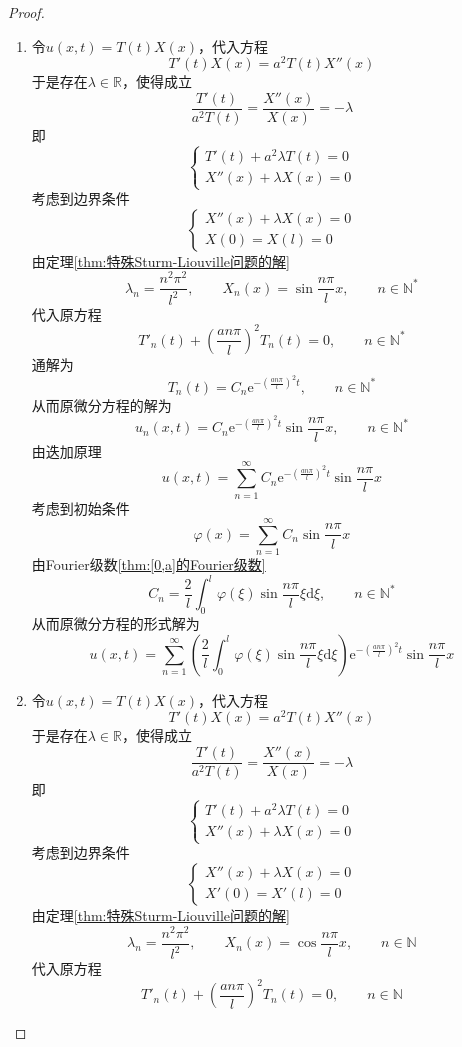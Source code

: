\documentclass[lang = cn, scheme = chinese, thmcnt = section]{elegantbook}
\newcommand{\N}{\mathbb{N}}            %
\newcommand{\R}{\mathbb{R}}            %
\newcommand{\dd}{\mathrm{d}}           %
\newcommand{\ee}[1]{\mathrm{e}^{#1}}   %
\begin{document}
\begin{proof}
	\begin{enumerate}
		\item 令$u(x,t)=T(t)X(x)$，代入方程
		$$
		T'(t)X(x)=a^2T(t)X''(x)
		$$
		于是存在$\lambda\in\R$，使得成立
		$$
		\frac{T'(t)}{a^2T(t)}
		=\frac{X''(x)}{X(x)}
		=-\lambda
		$$
		即%
		$$
		\begin{cases}
			T'(t)+a^2\lambda T(t)=0\\
			X''(x)+\lambda X(x)=0
		\end{cases}
		$$
		考虑到边界条件
		$$
		\begin{cases}
			X''(x)+\lambda X(x)=0\\
			X(0)=X(l)=0
		\end{cases}
		$$
		由定理\ref{thm:特殊Sturm-Liouville问题的解}
		$$
		\lambda_n=\frac{n^2\pi^2}{l^2},\qquad 
		X_n(x)=\sin\frac{n\pi}{l}x,\qquad n\in\N^*
		$$
		代入原方程
		$$
		T'_n(t)+\left(\frac{an\pi}{l}\right)^2T_n(t)=0,\qquad n\in\N^*
		$$
		通解为
		$$
		T_n(t)=C_n\ee{-\left(\frac{an\pi}{l}\right)^2t},\qquad 
		n\in\N^*
		$$
		从而原微分方程的解为
		$$
		u_n(x,t)
		=C_n\ee{-\left(\frac{an\pi}{l}\right)^2t}\sin\frac{n\pi}{l}x,\qquad 
		n\in\N^*
		$$
		由迭加原理
		$$
		u(x,t)=\sum_{n=1}^{\infty}C_n\ee{-\left(\frac{an\pi}{l}\right)^2t}\sin\frac{n\pi}{l}x
		$$
		考虑到初始条件
		$$
		\varphi(x)=\sum_{n=1}^{\infty}C_n\sin\frac{n\pi}{l}x
		$$
		由Fourier级数\ref{thm:[0,a]的Fourier级数}
		$$
		C_n=\frac{2}{l}\int_0^l\varphi(\xi)\sin\frac{n\pi }{l}\xi\dd \xi,\qquad 
		n\in\N^*
		$$
		从而原微分方程的形式解为
		$$
		u(x,t)=\sum_{n=1}^{\infty}\left(\frac{2}{l}\int_0^l\varphi(\xi)\sin\frac{n\pi }{l}\xi\dd \xi\right)\ee{-\left(\frac{an\pi}{l}\right)^2t}\sin\frac{n\pi}{l}x
		$$
		\item 令$u(x,t)=T(t)X(x)$，代入方程
		$$
		T'(t)X(x)=a^2T(t)X''(x)
		$$
		于是存在$\lambda\in\R$，使得成立
		$$
		\frac{T'(t)}{a^2T(t)}
		=\frac{X''(x)}{X(x)}
		=-\lambda
		$$
		即%
		$$
		\begin{cases}
			T'(t)+a^2\lambda T(t)=0\\
			X''(x)+\lambda X(x)=0
		\end{cases}
		$$
		考虑到边界条件
		$$
		\begin{cases}
			X''(x)+\lambda X(x)=0\\
			X'(0)=X'(l)=0
		\end{cases}
		$$
		由定理\ref{thm:特殊Sturm-Liouville问题的解}%
		$$
		\lambda_n=\frac{n^2\pi^2}{l^2},\qquad 
		X_n(x)=\cos\frac{n\pi}{l}x,\qquad n\in\N
		$$
		代入原方程
		$$
		T'_n(t)+\left(\frac{an\pi}{l}\right)^2T_n(t)=0,\qquad n\in\N
$$
\end{enumerate}
\end{proof}
\end{document}
